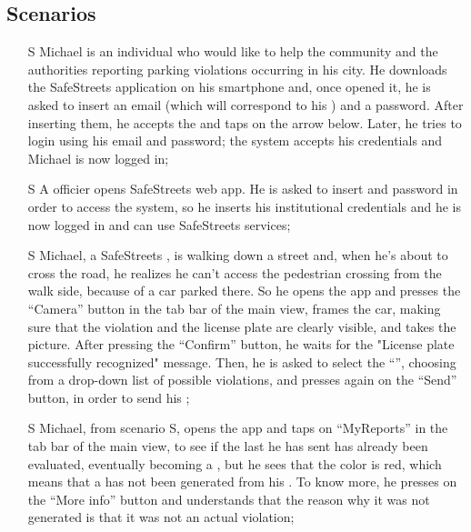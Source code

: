 \documentclass[../../../RASD.tex]{subfiles}
\begin{document}
\subsection{Scenarios\label{sect:3.2.1}}

\begin{itemize}
	\item[S\subs{1}]Michael is an individual who would like to help the community and the authorities reporting parking violations occurring in his city. He downloads the SafeStreets application on his smartphone and, once opened it, he is asked to insert an email (which will correspond to his ) and a password. After inserting them, he accepts the  and taps on the arrow below. Later, he tries to login using his email and password; the system accepts his credentials and Michael is now logged in;
	
	\item[S\subs{2}]A  officier opens SafeStreets web app. He is asked to insert  and password in order to access the system, so he inserts his  institutional credentials and he is now logged in and can use SafeStreets services;
	
	\item[S\subs{3}]Michael, a SafeStreets , is walking down a street and, when he’s about to cross the road, he realizes he can’t access the pedestrian crossing from the walk side, because of a car parked there. So he opens the app and presses the “Camera” button in the tab bar of the main view, frames the car, making sure that the violation and the license plate are clearly visible, and takes the picture. After pressing the “Confirm” button, he waits for the "License plate successfully recognized" message. Then, he is asked to select the “”, choosing from a drop-down list of possible violations, and presses again on the “Send” button, in order to send his ;
	
	\item[S\subs{4}]Michael, from scenario S, opens the app and taps on “MyReports” in the tab bar of the main view, to see if the last  he has sent has already been evaluated, eventually becoming a , but he sees that the  color is red, which means that a  has not been generated from his . To know more, he presses on the “More info” button and understands that the reason why it was not generated is that it was not an actual violation;
	

\end{itemize}
\end{document}
